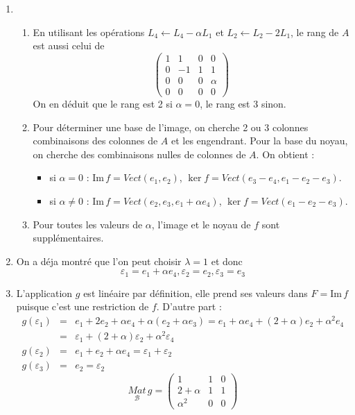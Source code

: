 \begin{enumerate}
\item \begin{enumerate}
\item  En utilisant les op\'{e}rations $L_{4}\leftarrow L_{4}-\alpha L_{1}$ et $L_{2}\leftarrow L_{2}-2L_{1}$, le rang de $A$ est aussi celui de 
\[\left( \begin{array}{cccc}1 & 1 & 0 & 0 \\
0 & -1 & 1 & 1 \\ 
0 & 0 & 0 & \alpha  \\ 
0 & 0 & 0 & 0
\end{array}\right) \]
On en d\'{e}duit que le rang est 2 si $\alpha =0$, le rang est 3 sinon.
\item  Pour d\'{e}terminer une base de l'image, on cherche 2 ou 3
colonnes combinaisons des colonnes de $A$ et les engendrant.
Pour la base du noyau, on cherche des combinaisons nulles de colonnes de $A$. On obtient :
\begin{itemize}
\item  si $\alpha =0$ : $\text{Im}\,f=Vect(e_{1},e_{2})$, $\ker
f=Vect(e_{3}-e_{4},e_{1}-e_{2}-e_{3})$.
\item  si $\alpha \neq 0$ : $\text{Im}\,f=Vect(e_{2},e_{3},e_{1}+\alpha e_{4})$, $\ker f=Vect(e_{1}-e_{2}-e_{3}).$
\end{itemize}
\item Pour toutes les valeurs de $\alpha$, l'image et le noyau de $f$ sont suppl\'{e}mentaires.
\end{enumerate}

\item  On a d\'{e}ja montr\'{e} que l'on peut choisir $\lambda =1$ et donc 
$$\varepsilon _{1}=e_{1}+\alpha e_{4},\varepsilon _{2}=e_{2},\varepsilon_{3}=e_{3}$$
\item L'application $g$ est lin\'{e}aire par d\'{e}finition, elle prend
ses valeurs dans $F=\text{Im}\,f$ puisque c'est une restriction de $f$.
D'autre part :
\begin{eqnarray*}
g(\varepsilon _{1})&=&e_{1}+2e_{2}+\alpha e_{4}+\alpha (e_{2}+\alpha
e_{3})=e_{1}+\alpha e_{4}+(2+\alpha )e_{2}+\alpha ^{2}e_{4}\\
&=&\varepsilon_{1}+(2+\alpha )\varepsilon _{2}+\alpha ^{2}\varepsilon _{4}\\
g(\varepsilon _{2})&=&e_{1}+e_{2}+\alpha e_{4}=\varepsilon _{1}+\varepsilon
_{2}\\ 
g(\varepsilon _{3})&=&e_{2}=\varepsilon _{2}
\end{eqnarray*}
\begin{displaymath}
\underset{\mathcal{B}}{Mat}\,g=\left( 
\begin{array}{ccc}
1 & 1 & 0 \\ 
2+\alpha  & 1 & 1 \\ 
\alpha ^{2} & 0 & 0
\end{array}
\right) 
\end{displaymath}


\end{enumerate}
